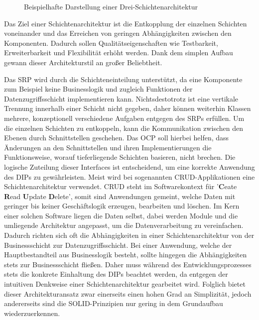 \begin{figure}[htbp]
	\centering
	\large
	
	\caption{Beispielhafte Darstellung einer Drei-Schichtenarchitektur}
	\label{fig:Schichtenarchitektur}
\end{figure}

Das Ziel einer Schichtenarchitektur ist die Entkopplung der einzelnen Schichten voneinander und das Erreichen von geringen Abhängigkeiten zwischen den Komponenten. Dadurch sollen Qualitätseigenschaften wie Testbarkeit, Erweiterbarkeit und Flexibilität erhöht werden. Dank dem simplen Aufbau gewann dieser Architekturstil an großer Beliebtheit. 

Das \acrlong{SRP} wird durch die Schichteneinteilung unterstützt, da eine Komponente zum Beispiel keine Businesslogik und zugleich Funktionen der Datenzugriffsschicht implementieren kann. Nichtsdestotrotz ist eine vertikale Trennung innerhalb einer Schicht nicht gegeben, daher können weiterhin Klassen mehrere, konzeptionell verschiedene Aufgaben entgegen des SRPs erfüllen. Um die einzelnen Schichten zu entkoppeln, kann die Kommunikation zwischen den Ebenen durch Schnittstellen geschehen. Das \acrlong{OCP} soll hierbei helfen, dass Änderungen an den Schnittstellen und ihren Implementierungen die Funktionsweise, worauf tieferliegende Schichten basieren, nicht brechen. Die logische Zuteilung dieser Interfaces ist entscheidend, um eine korrekte Anwendung des \acrlong{DIP}s zu gewährleisten. Meist wird bei sogenannten CRUD-Applikationen eine Schichtenarchitektur verwendet. \acrshort{CRUD} steht im Softwarekontext für '\textbf{C}eate \textbf{R}ead \textbf{U}pdate \textbf{D}elete', somit sind Anwendungen gemeint, welche Daten mit geringer bis keiner Geschäftslogik erzeugen, bearbeiten und löschen. Im Kern einer solchen Software liegen die Daten selbst, dabei werden Module und die umliegende Architektur angepasst, um die Datenverarbeitung zu vereinfachen. Dadurch richten sich oft die Abhängigkeiten in einer Schichtenarchitektur von der Businessschicht zur Datenzugriffsschicht. Bei einer Anwendung, welche der Hauptbestandteil aus Businesslogik besteht, sollte hingegen die Abhängigkeiten stets zur Businessschicht fließen. Daher muss während des Entwicklungsprozesses stets die konkrete Einhaltung des DIPs beachtet werden, da entgegen der intuitiven Denkweise einer Schichtenarchitektur gearbeitet wird. Folglich bietet dieser Architekturansatz zwar einerseits einen hohen Grad an Simplizität, jedoch andererseits sind die SOLID-Prinzipien nur gering in dem Grundaufbau wiederzuerkennen.


